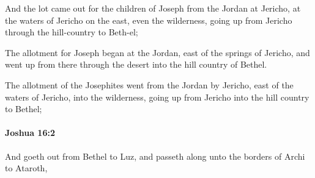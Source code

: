 			\begin{versebox}
					\item[BHS] 
					\item[ASV] And the lot came out for the children of Joseph from the Jordan at Jericho, at the waters of Jericho on the east, even the wilderness, going up from Jericho through the hill-country to Beth-el;
					\item[NIV] The allotment for Joseph began at the Jordan, east of the springs of Jericho, and went up from there through the desert into the hill country of Bethel.
					\item[NRSV] The allotment of the Josephites went from the Jordan by Jericho, east of the waters of Jericho, into the wilderness, going up from Jericho into the hill country to Bethel;
			\end{versebox}

		\paragraph{Joshua 16:2} %
			\label{JOSHUA-16-2}

			And goeth out from Bethel to Luz, and passeth along unto the borders of Archi to Ataroth,

